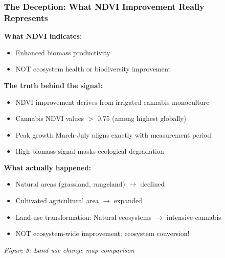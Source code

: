 \documentclass{beamer}
\begin{document}
\begin{frame}
\frametitle{The Deception: What NDVI Improvement Really Represents}

\textbf{What NDVI indicates:}
\begin{itemize}
  \item Enhanced biomass productivity
  \item NOT ecosystem health or biodiversity improvement
\end{itemize}

\textbf{The truth behind the signal:}
\begin{itemize}
  \item NDVI improvement derives from irrigated cannabis monoculture
  \item Cannabis NDVI values $>$ 0.75 (among highest globally)
  \item Peak growth March-July aligns exactly with measurement period
  \item High biomass signal masks ecological degradation
\end{itemize}

\textbf{What actually happened:}
\begin{itemize}
  \item Natural areas (grassland, rangeland) $\to$ declined
  \item Cultivated agricultural area $\to$ expanded
  \item Land-use transformation: Natural ecosystems $\to$ intensive cannabis
  \item NOT ecosystem-wide improvement; ecosystem conversion!
\end{itemize}

\begin{center}
  \small{\textit{Figure 8: Land-use change map comparison}}
\end{center}
\end{frame}
\end{document}
